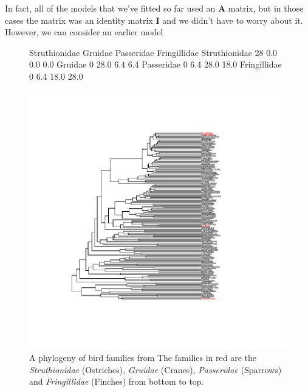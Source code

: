 \documentclass{article}
\begin{document}
In fact, all of the models that we've fitted so far used an {\bf A} matrix, but in those cases the matrix was an identity matrix {\bf I} and we didn't have to worry about it. However, we can consider an earlier model   

\begin{figure}[!h]
\begin{center}
\begin{Schunk}
\begin{Soutput}
              Struthionidae Gruidae Passeridae Fringillidae
Struthionidae            28     0.0        0.0          0.0
Gruidae                   0    28.0        6.4          6.4
Passeridae                0     6.4       28.0         18.0
Fringillidae              0     6.4       18.0         28.0
\end{Soutput}
\end{Schunk}
\includegraphics{Lecture6-005}
\end{center}
\caption{A phylogeny of bird families from \citet{Sibley.1990} The families in red are the \emph{Struthionidae} (Ostriches), \emph{Gruidae} (Cranes),  \emph{Passeridae} (Sparrows)  and \emph{Fringillidae} (Finches) from bottom to top.}
\label{bird.families-fig}
\end{figure}

\ifalone
\end{document}

